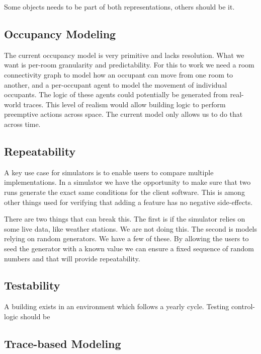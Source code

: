 \documentclass[10pt]{article}
\begin{document}
Some objects needs to be part of both representations, others should be it.

\subsection{Occupancy Modeling}
\label{lessons:occupancy}

The current occupancy model is very primitive and lacks resolution. What we want is per-room granularity and predictability. For this to work we need a room connectivity graph to model how an occupant can move from one room to another, and a per-occupant agent to model the movement of individual occupants. The logic of these agents could potentially be generated from real-world traces. This level of realism would allow building logic to perform preemptive actions across space. The current model only allows us to do that across time.

\subsection{Repeatability}

A key use case for simulators is to enable users to compare multiple implementations. In a simulator we have the opportunity to make sure that two runs generate the exact same conditions for the client software. This is among other things used for verifying that adding a feature has no negative side-effects.

There are two things that can break this. The first is if the simulator relies on some live data, like weather stations. We are not doing this. The second is models relying on random generators. We have a few of these. By allowing the users to seed the generator with a known value we can ensure a fixed sequence of random numbers and that will provide repeatability.

\subsection{Testability}

A building exists in an environment which follows a yearly cycle. Testing control-logic should be 

\subsection{Trace-based Modeling}

\end{document}
